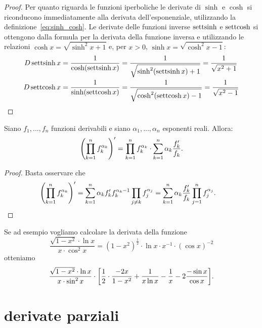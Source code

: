 \begin{proof}
Per quanto riguarda le funzioni iperboliche le derivate di $\sinh$
e $\cosh$ si riconducono immediatamente alla derivata dell'esponenziale,
utilizzando
la definizione~\eqref{eq:sinh_cosh}. Le derivate delle funzioni
inverse $\operatorname{settsinh}$ e $\operatorname{settcosh}$ si ottengono dalla formula per la derivata
della funzione inversa e utilizzando
le relazioni $\cosh x = \sqrt{\sinh^2 x+1}$ e, per $x > 0$,
$\sinh x = \sqrt{\cosh^2 x -1}$:
\begin{align*}
  D \operatorname{settsinh} x &= \frac{1}{\cosh(\operatorname{settsinh} x)}
  = \frac{1}{\sqrt{\sinh^2 (\operatorname{settsinh} x) + 1}} = \frac{1}{\sqrt{x^2+1}}\\
  D \operatorname{settcosh} x &= \frac{1}{\sinh(\operatorname{settcosh} x)}
  = \frac{1}{\sqrt{\cosh^2(\operatorname{settcosh} x)-1}}
  = \frac{1}{\sqrt{x^2-1}}
\end{align*}
\end{proof}

\begin{proposition}
Siano $f_1,\dots, f_n$ funzioni derivabili e siano $\alpha_1,\dots, \alpha_n$ 
esponenti reali. Allora:
  \[
  {\left( \prod_{k=1}^n f_k^{\alpha_k} \right)}'
  = \prod_{k=1}^n f_k^{\alpha_k} \cdot \sum_{k=1}^n \alpha_k \frac{f_k'}{f_k}.
  \]
\end{proposition}
\begin{proof}
Basta osservare che 
\begin{align*}
  {\left( \prod_{k=1}^n f_k^{\alpha_k} \right)}'
  &= \sum_{k=1}^n \alpha_k f_k' f_k^{\alpha_k-1} \prod_{j\neq k} f_j^{\alpha_j}
  = \sum_{k=1}^n \alpha_k \frac{f_k'}{f_k} \prod_{j=1}^n f_j^{\alpha_j}.
\end{align*}
\end{proof}
Se ad esempio vogliamo calcolare la derivata della funzione 
\[
 \frac{\sqrt{1-x^2}\cdot \ln x}{x\cdot \cos^2 x}
 = (1-x^2)^{\frac 1 2} \cdot \ln x \cdot x^{-1}\cdot (\cos x)^{-2}
\]
otteniamo 
\[
  \frac{\sqrt{1-x^2}\cdot \ln x}{x\cdot \sin^2 x}
  \cdot {\left[ \frac 1 2 \cdot \frac{-2x}{1-x^2} + \frac{1}{x\ln x} - \frac{1}{x}-2\frac{-\sin x}{\cos x} \right]}.
\]

\section{derivate parziali}

